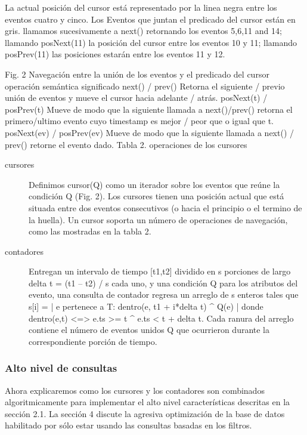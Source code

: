 \documentclass[12pt,a4paper]{report}
\begin{document}
	La actual posición del cursor está representado por la linea negra entre los eventos cuatro y cinco.  Los Eventos que juntan el predicado del cursor están en gris.   llamamos sucesivamente a next() retornando los eventos 5,6,11 and 14;  llamando posNext(11) la posición del cursor entre los eventos 10 y 11; llamando posPrev(11) las posiciones estarán entre los eventos 11 y 12.

Fig. 2 Navegación entre la unión de los eventos y el predicado del cursor 
operación
semántica {significado}
next() / prev()
Retorna el siguiente / previo unión de eventos y mueve el cursor hacia adelante / atrás.
posNext(t) / posPrev(t)
Mueve de modo que la siguiente llamada a next()/prev() retorna el primero/ultimo evento cuyo timestamp es mejor / peor que o igual que t.
posNext(ev) / posPrev(ev)
Mueve de modo que la siguiente llamada a next() / prev() retorne el evento dado.
Tabla 2. operaciones de los cursores

\begin{description}
	\item[cursores] Definimos cursor(Q) como un iterador sobre los eventos que reúne la condición Q (Fig. 2).  Los cursores tienen una posición actual que está situada entre dos eventos consecutivos (o hacia el principio o el termino de la huella).  Un cursor soporta un número de operaciones de navegación, como las mostradas en la tabla 2.

	\item[contadores] Entregan un intervalo de tiempo [t1,t2] dividido en s porciones de largo delta t = (t1 – t2) / s cada uno, y una condición Q para los atributos del evento, una consulta de contador regresa un arreglo de s enteros tales que s[i] = | {e pertenece a T: dentro(e, t1 + i*delta t) ^ Q(e)} | donde dentro(e,t) <=> e.ts >= t ^ e.ts < t + delta t.   Cada ranura del arreglo contiene el número de eventos unidos Q que ocurrieron durante la correspondiente porción de tiempo.
\end{description}

			\subsubsection{Alto nivel de consultas}

	Ahora explicaremos como los cursores y los contadores son combinados algoritmicamente para implementar el alto nivel características descritas en la sección 2.1.  La sección 4 discute la agresiva optimización de la base de datos habilitado por sólo estar usando las consultas basadas en los filtros.
\end{document}
